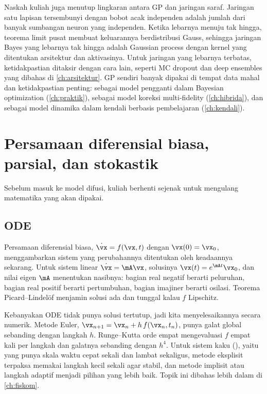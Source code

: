 Naskah kuliah juga menutup lingkaran antara GP dan jaringan saraf. Jaringan satu lapisan tersembunyi dengan bobot acak independen adalah
jumlah dari banyak sumbangan neuron yang independen. Ketika lebarnya menuju tak hingga, teorema limit pusat membuat keluarannya
berdistribusi Gauss, sehingga jaringan Bayes yang lebarnya tak hingga adalah Gaussian process dengan kernel yang ditentukan arsitektur
dan aktivasinya. Untuk jaringan yang lebarnya terbatas, ketidakpastian ditaksir dengan cara lain, seperti MC dropout dan deep ensembles
yang dibahas di \cref{ch:arsitektur}. GP sendiri banyak dipakai di tempat data mahal dan ketidakpastian penting: sebagai model pengganti
dalam Bayesian optimization (\cref{ch:praktik}), sebagai model koreksi multi-fidelity (\cref{ch:hibrida}), dan sebagai model dinamika
dalam kendali berbasis pembelajaran (\cref{ch:kendali}).

\section{Persamaan diferensial biasa, parsial, dan stokastik}

Sebelum masuk ke model difusi, kuliah berhenti sejenak untuk mengulang matematika yang akan dipakai.

\subsection{ODE}

Persamaan diferensial biasa, $\dot{\vx}=f(\vx,t)$ dengan $\vx(0)=\vx_0$, menggambarkan sistem yang
perubahannya ditentukan oleh keadaannya sekarang. Untuk sistem linear $\dot{\vx}=\mA\vx$, solusinya
$\vx(t)=e^{\mA t}\vx_0$, dan nilai eigen $\mA$ menentukan nasibnya: bagian real negatif berarti
peluruhan, bagian real positif berarti pertumbuhan, bagian imajiner berarti osilasi. Teorema
Picard--Lindelöf menjamin solusi ada dan tunggal kalau $f$ Lipschitz.

Kebanyakan ODE tidak punya solusi tertutup, jadi kita menyelesaikannya secara numerik. Metode Euler,
$\vx_{n+1}=\vx_n+h\,f(\vx_n,t_n)$, punya galat global sebanding dengan langkah $h$. Runge--Kutta orde
empat mengevaluasi $f$ empat kali per langkah dan galatnya sebanding dengan $h^4$. Untuk sistem kaku
(), yaitu yang punya skala waktu cepat sekali dan lambat sekaligus, metode
eksplisit terpaksa memakai langkah kecil sekali agar stabil, dan metode implisit atau langkah
adaptif menjadi pilihan yang lebih baik. Topik ini dibahas lebih dalam di \cref{ch:fiskom}.

